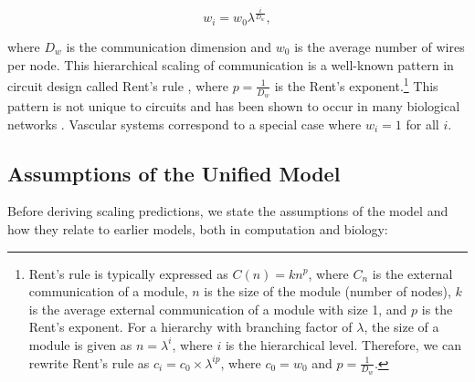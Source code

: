 \documentclass[12pt]{article}
\begin{document}
\begin{equation}
  w_i = w_0 \lambda^{\frac{i}{D_w}},
\label{eq:communication}
\end{equation}

\noindent where $D_w$ is the communication dimension and $w_0$ is the average
number of wires per node.  This hierarchical scaling of communication is a
well-known pattern in circuit design called Rent's rule \cite{christie00},
where $p = \frac{1}{D_w}$ is the Rent's exponent.\footnote{Rent's rule is typically
  expressed as $C(n) = kn^p$, where $C_n$ is the external communication of a
  module, $n$ is the size of the module (number of nodes), $k$ is the average
  external communication of a module with size 1, and $p$ is the Rent's
  exponent. For a hierarchy with branching factor of $\lambda$, the size of a
  module is given as $n = \lambda^i$, where $i$ is the hierarchical level.
  Therefore, we can rewrite Rent's rule as $c_i = c_0 \times \lambda^{ip}$,
where $c_0 = w_0$ and $p = \frac{1}{D_w}$.} This pattern is not unique to circuits
and has been shown to occur in many biological networks
\cite{reda09,bassett10,meunier2010modular,solee2013evolutionary}.   Vascular systems correspond to a special case where 
$w_i = 1$ for all $i$. 

\subsection{Assumptions of the Unified Model}
\label{sec:assumptions}

Before deriving scaling predictions, we state the
assumptions of the model and how they relate to earlier models, both in
computation and biology:
\end{document}

